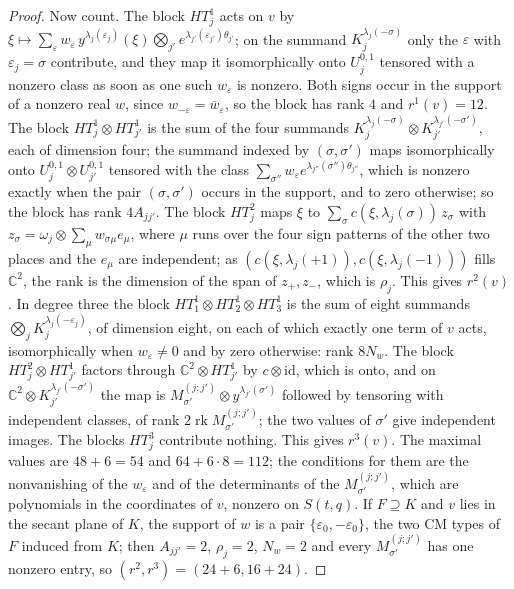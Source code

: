 \documentclass[11pt,reqno]{amsart}
\theoremstyle{plain}
\theoremstyle{definition}
\theoremstyle{remark}
\newcommand{\CC}{\mathbb{C}}
\DeclareMathOperator{\rk}{rk}
\newcommand{\bbar}[1]{\overline{#1}}
\begin{document}
\begin{proof}
Now count. The block $HT^{1}_{j}$ acts on $v$ by
$\xi\mapsto\sum_{\varepsilon}w_{\varepsilon}\,y^{\lambda_{j}(\varepsilon_{j})}(\xi)
\bigotimes_{j'}e^{\lambda_{j'}(\varepsilon_{j'})\theta_{j'}}$; on the summand
$K^{\lambda_{j}(-\sigma)}_{j}$ only the $\varepsilon$ with
$\varepsilon_{j}=\sigma$ contribute, and they map it isomorphically onto
$U_{j}^{0,1}$ tensored with a nonzero class as soon as one such
$w_{\varepsilon}$ is nonzero. Both signs occur in the support of a nonzero real
$w$, since $w_{-\varepsilon}=\bbar{w}_{\varepsilon}$, so the block has rank $4$
and $r^{1}(v)=12$. The block $HT^{1}_{j}\otimes HT^{1}_{j'}$ is the sum of the
four summands $K^{\lambda_{j}(-\sigma)}_{j}\otimes K^{\lambda_{j'}(-\sigma')}_{j'}$,
each of dimension four; the summand indexed by $(\sigma,\sigma')$ maps
isomorphically onto $U_{j}^{0,1}\otimes U_{j'}^{0,1}$ tensored with the class
$\sum_{\sigma''}w_{\varepsilon}e^{\lambda_{j''}(\sigma'')\theta_{j''}}$, which
is nonzero exactly when the pair $(\sigma,\sigma')$ occurs in the support, and
to zero otherwise; so the block has rank $4A_{jj'}$. The block $HT^{2}_{j}$
maps $\xi$ to $\sum_{\sigma}c(\xi,\lambda_{j}(\sigma))\,z_{\sigma}$ with
$z_{\sigma}=\omega_{j}\otimes\sum_{\mu}w_{\sigma\mu}e_{\mu}$, where $\mu$ runs
over the four sign patterns of the other two places and the $e_{\mu}$ are
independent; as $(c(\xi,\lambda_{j}(+1)),c(\xi,\lambda_{j}(-1)))$ fills
$\CC^{2}$, the rank is the dimension of the span of $z_{+},z_{-}$, which is
$\rho_{j}$. This gives $r^{2}(v)$. In degree three the block
$HT^{1}_{1}\otimes HT^{1}_{2}\otimes HT^{1}_{3}$ is the sum of eight summands
$\bigotimes_{j}K^{\lambda_{j}(-\varepsilon_{j})}_{j}$, of dimension eight, on
each of which exactly one term of $v$ acts, isomorphically when
$w_{\varepsilon}\ne0$ and by zero otherwise: rank $8N_{w}$. The block
$HT^{2}_{j}\otimes HT^{1}_{j'}$ factors through $\CC^{2}\otimes HT^{1}_{j'}$
by $c\otimes\mathrm{id}$, which is onto, and on
$\CC^{2}\otimes K^{\lambda_{j'}(-\sigma')}_{j'}$ the map is
$M^{(j;j')}_{\sigma'}\otimes y^{\lambda_{j'}(\sigma')}$ followed by tensoring
with independent classes, of rank $2\rk M^{(j;j')}_{\sigma'}$; the two values
of $\sigma'$ give independent images. The blocks $HT^{3}_{j}$ contribute
nothing. This gives $r^{3}(v)$. The maximal values are $48+6=54$ and
$64+6\cdot8=112$; the conditions for them are the nonvanishing of the
$w_{\varepsilon}$ and of the determinants of the $M^{(j;j')}_{\sigma'}$, which
are polynomials in the coordinates of $v$, nonzero on $S(t,q)$. If $F\supseteq K$
and $v$ lies in the secant plane of $K$, the support of $w$ is a pair
$\{\varepsilon_{0},-\varepsilon_{0}\}$, the two CM types of $F$ induced from
$K$; then $A_{jj'}=2$, $\rho_{j}=2$, $N_{w}=2$ and every
$M^{(j;j')}_{\sigma'}$ has one nonzero entry, so $(r^{2},r^{3})=(24+6,16+24)$.


\end{proof}
\end{document}
